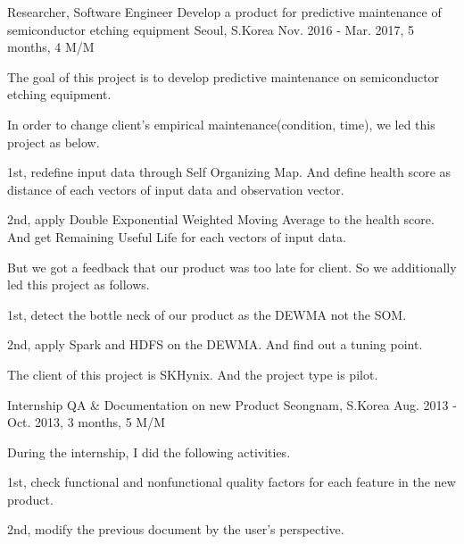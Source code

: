 \begin{cventries}
  \cventry
    {Researcher, Software Engineer} %
    {Develop a product for predictive maintenance of semiconductor etching equipment} %
    {Seoul, S.Korea} %
    {Nov. 2016 - Mar. 2017, 5 months, 4 M/M} %
    {
      \begin{cvitems} %
        \item {The goal of this project is to develop predictive maintenance on semiconductor etching equipment.}
        \item {In order to change client's empirical maintenance(condition, time), we led this project as below.}
        \item {1st, redefine input data through Self Organizing Map. And define health score as distance of each vectors of input data and observation vector.}
        \item {2nd, apply Double Exponential Weighted Moving Average to the health score. And get Remaining Useful Life for each vectors of input data.}
        \item {But we got a feedback that our product was too late for client. So we additionally led this project as follows.}
        \item {1st, detect the bottle neck of our product as the DEWMA not the SOM.}
        \item {2nd, apply Spark and HDFS on the DEWMA. And find out a tuning point.}
        \item {The client of this project is SKHynix. And the project type is pilot.}
      \end{cvitems}
    }

  \cventry
    {Internship} %
    {QA \& Documentation on new Product} %
    {Seongnam, S.Korea} %
    {Aug. 2013 - Oct. 2013, 3 months, 5 M/M} %
    {
      \begin{cvitems} %
        \item {During the internship, I did the following activities.}
        \item {1st, check functional and nonfunctional quality factors for each feature in the new product.}
        \item {2nd, modify the previous document by the user's perspective.}
      \end{cvitems}
    }

\end{cventries}
